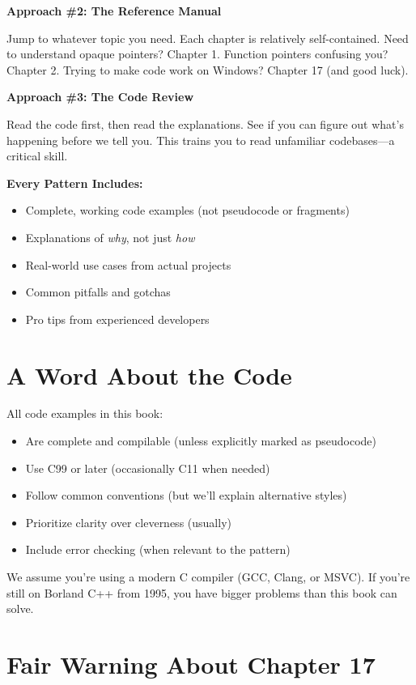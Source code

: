 \documentclass[10pt,openany]{book}
\begin{document}
\textbf{Approach \#2: The Reference Manual}

Jump to whatever topic you need. Each chapter is relatively self-contained. Need to understand opaque pointers? Chapter 1. Function pointers confusing you? Chapter 2. Trying to make code work on Windows? Chapter 17 (and good luck).

\textbf{Approach \#3: The Code Review}

Read the code first, then read the explanations. See if you can figure out what's happening before we tell you. This trains you to read unfamiliar codebases---a critical skill.

\begin{notebox}
\textbf{Every Pattern Includes:}
\begin{itemize}
    \item Complete, working code examples (not pseudocode or fragments)
    \item Explanations of \textit{why}, not just \textit{how}
    \item Real-world use cases from actual projects
    \item Common pitfalls and gotchas
    \item Pro tips from experienced developers
\end{itemize}
\end{notebox}

\section*{A Word About the Code}

All code examples in this book:
\begin{itemize}
    \item Are complete and compilable (unless explicitly marked as pseudocode)
    \item Use C99 or later (occasionally C11 when needed)
    \item Follow common conventions (but we'll explain alternative styles)
    \item Prioritize clarity over cleverness (usually)
    \item Include error checking (when relevant to the pattern)
\end{itemize}

We assume you're using a modern C compiler (GCC, Clang, or MSVC). If you're still on Borland C++ from 1995, you have bigger problems than this book can solve.

\section*{Fair Warning About Chapter 17}
\end{document}
